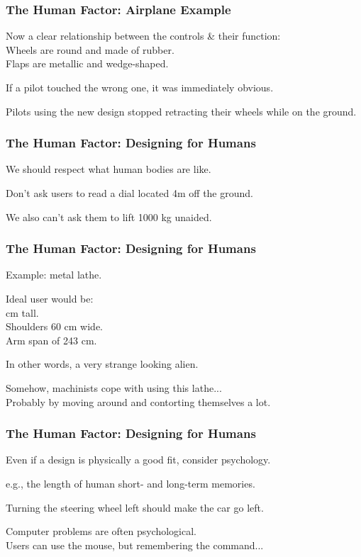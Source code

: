 \begin{frame}
\frametitle{The Human Factor: Airplane Example}
\begin{changemargin}{1cm}

Now a clear relationship between the controls \& their function:\\
\quad Wheels are round and made of rubber. \\
\quad Flaps are metallic and wedge-shaped.

If a pilot touched the wrong one, it was immediately obvious. 

Pilots using the new design stopped retracting their wheels while on the ground.

\end{changemargin}
\end{frame}

\begin{frame}
\frametitle{The Human Factor: Designing for Humans}
\begin{changemargin}{1cm}
We should respect what human bodies are like.

Don't ask users to read a dial located 4m off the ground.

We also can't ask them to lift 1000 kg unaided.

\end{changemargin}
\end{frame}

\begin{frame}
\frametitle{The Human Factor: Designing for Humans}
\begin{changemargin}{1cm}
Example: metal lathe.

Ideal user would be: \\
	 cm tall.\\
	\quad Shoulders 60 cm wide.\\
	\quad Arm span of 243 cm. 
	
	In other words, a very strange looking alien. 
	
	Somehow, machinists cope with using this lathe... \\
	\quad Probably by moving around and contorting themselves a lot. 

\end{changemargin}
\end{frame}

\begin{frame}
\frametitle{The Human Factor: Designing for Humans}
\begin{changemargin}{1cm}
Even if a design is physically a good fit, consider psychology.

e.g., the length of human short- and long-term memories.

Turning the steering wheel left should make the car go left.

Computer problems are often psychological.\\
\quad Users can use the mouse, but remembering the command...

\end{changemargin}
\end{frame}


